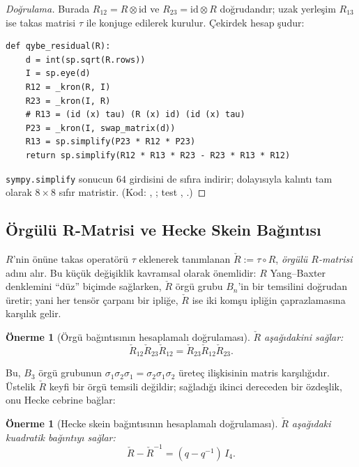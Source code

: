 \documentclass[10pt]{math}
\numberwithin{equation}{section}
\theoremstyle{plain}
\newtheorem{proposition}[theorem]{Önerme}
\theoremstyle{definition}
\newcommand{\id}{\mathrm{id}}
\begin{document}
\begin{proof}[Doğrulama]
Burada $R_{12}=R\otimes\id$ ve $R_{23}=\id\otimes R$ doğrudandır; uzak yerleşim
$R_{13}$ ise takas matrisi $\tau$ ile konjuge edilerek kurulur. Çekirdek
hesap şudur:
\begin{lstlisting}[style=pyblock,caption={QYBE kalıntısı ve $R_{13}$'ün takasla inşası}]
def qybe_residual(R):
    d = int(sp.sqrt(R.rows))
    I = sp.eye(d)
    R12 = _kron(R, I)
    R23 = _kron(I, R)
    # R13 = (id (x) tau) (R (x) id) (id (x) tau)
    P23 = _kron(I, swap_matrix(d))
    R13 = sp.simplify(P23 * R12 * P23)
    return sp.simplify(R12 * R13 * R23 - R23 * R13 * R12)
\end{lstlisting}
\texttt{sympy.simplify} sonucun $64$ girdisini de sıfıra indirir; dolayısıyla
kalıntı tam olarak $8\times 8$ sıfır matristir. (Kod: ,
; test , .)
\end{proof}

\subsection{Örgülü R-Matrisi ve Hecke Skein Bağıntısı}

$R$'nin önüne takas operatörü $\tau$ eklenerek tanımlanan
$\check R := \tau \circ R$, \emph{örgülü $R$-matrisi} adını alır. Bu küçük
değişiklik kavramsal olarak önemlidir: $R$ Yang--Baxter denklemini ``düz''
biçimde sağlarken, $\check R$ örgü grubu $B_n$'in bir temsilini doğrudan üretir;
yani her tensör çarpanı bir ipliğe, $\check R$ ise iki komşu ipliğin
çaprazlamasına karşılık gelir.

\begin{proposition}[Örgü bağıntısının hesaplamalı doğrulaması]\label{thm:braid}
$\check R$ aşağıdakini sağlar:
\[
  \check R_{12} \check R_{23} \check R_{12} = \check R_{23} \check R_{12} \check R_{23}.
\]
\end{proposition}

Bu, $B_3$ örgü grubunun $\sigma_1\sigma_2\sigma_1 = \sigma_2\sigma_1\sigma_2$
üreteç ilişkisinin matris karşılığıdır. Üstelik $\check R$ keyfi bir örgü
temsili değildir; sağladığı ikinci dereceden bir özdeşlik, onu Hecke cebrine
bağlar:

\begin{proposition}[Hecke skein bağıntısının hesaplamalı doğrulaması]\label{thm:hecke}
$\check R$ aşağıdaki kuadratik bağıntıyı sağlar:
\[
  \check R - \check R^{-1} = (q - q^{-1})\, I_4.
\]
\end{proposition}
\end{document}
